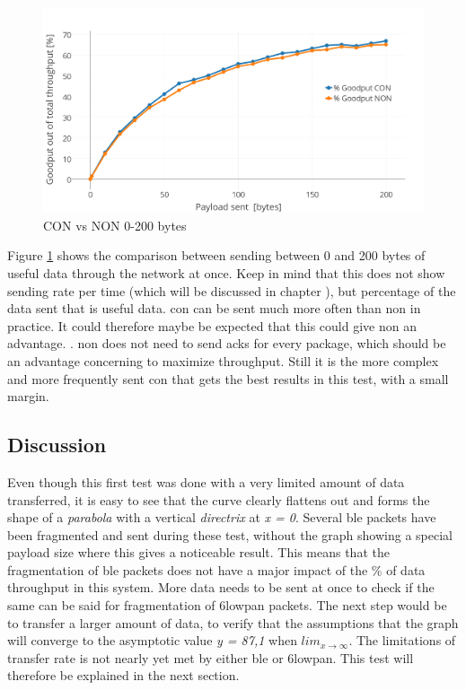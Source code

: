 



\begin{figure}[ht]
    \centering
    \includegraphics[scale=1.0]{CONvsNONplot_0-200_thicker2.png}    
    \caption{CON vs NON 0-200 bytes}
    \label{fig:CONvsNON0-200}
\end{figure}

\noindent Figure \ref{fig:CONvsNON0-200} shows the comparison between sending between 0 and 200 bytes of useful data through the network at once. Keep in mind that this does not show sending rate per time (which will be discussed in chapter ), but percentage of the data sent that is useful data. \gls{con} can be sent much more often than \gls{non} in practice. It could therefore maybe be expected that this could give \gls{non} an advantage. . \gls{non} does not need to send \glspl{ack} for every package, which should be an advantage concerning to maximize throughput. Still it is the more complex and more frequently sent \gls{con} that gets the best results in this test, with a small margin. 

\subsection{Discussion}

\noindent Even though this first test was done with a very limited amount of data transferred, it is easy to see that the curve clearly flattens out and forms the shape of a \textit{parabola} with a vertical \textit{directrix} at \textit{x = 0}. Several \gls{ble} packets have been fragmented and sent during these test, without the graph showing a special \gls{payload} size where this gives a noticeable result. This means that the fragmentation of \gls{ble} packets does not have a major impact of the \% of data throughput in this system. More data needs to be sent at once to check if the same can be said for fragmentation of \gls{6lowpan} packets. The next step would be to transfer a larger amount of data, to verify that the assumptions that the graph will converge to the asymptotic value \textit{y = 87,1} when $lim_{x\to\infty}$. The limitations of transfer rate is not nearly yet met by either \gls{ble} or \gls{6lowpan}.  This test will therefore be explained in the next section. 



